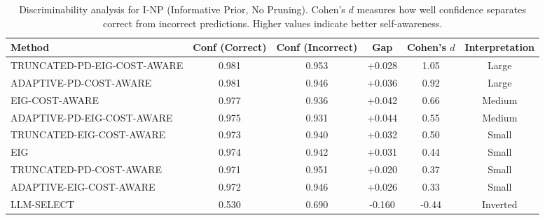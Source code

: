 \begin{table}[htbp]
\centering
\small
\caption{Discriminability analysis for I-NP (Informative Prior, No Pruning). Cohen's $d$ measures how well confidence separates correct from incorrect predictions. Higher values indicate better self-awareness.}
\label{tab:discriminability-notprune_notuniform}
\begin{tabular}{@{}lccccc@{}}
\toprule
Method & Conf (Correct) & Conf (Incorrect) & Gap & Cohen's $d$ & Interpretation \\
\midrule
TRUNCATED-PD-EIG-COST-AWARE & 0.981 & 0.953 & +0.028 & 1.05 & Large \\
ADAPTIVE-PD-COST-AWARE & 0.981 & 0.946 & +0.036 & 0.92 & Large \\
EIG-COST-AWARE & 0.977 & 0.936 & +0.042 & 0.66 & Medium \\
ADAPTIVE-PD-EIG-COST-AWARE & 0.975 & 0.931 & +0.044 & 0.55 & Medium \\
TRUNCATED-EIG-COST-AWARE & 0.973 & 0.940 & +0.032 & 0.50 & Small \\
EIG & 0.974 & 0.942 & +0.031 & 0.44 & Small \\
TRUNCATED-PD-COST-AWARE & 0.971 & 0.951 & +0.020 & 0.37 & Small \\
ADAPTIVE-EIG-COST-AWARE & 0.972 & 0.946 & +0.026 & 0.33 & Small \\
LLM-SELECT & 0.530 & 0.690 & -0.160 & -0.44 & Inverted \\
\bottomrule
\end{tabular}
\end{table}